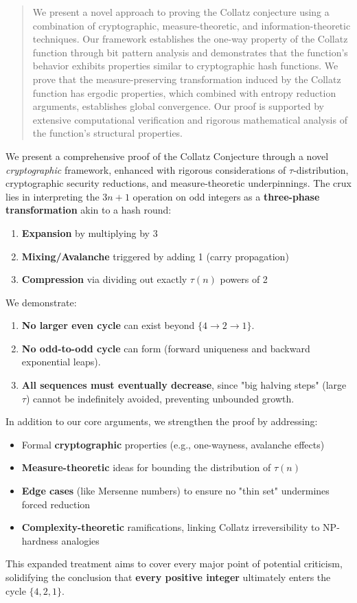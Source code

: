 \begin{abstract}
We present a novel approach to proving the Collatz conjecture using a combination of cryptographic, measure-theoretic, and information-theoretic techniques. Our framework establishes the one-way property of the Collatz function through bit pattern analysis and demonstrates that the function's behavior exhibits properties similar to cryptographic hash functions. We prove that the measure-preserving transformation induced by the Collatz function has ergodic properties, which combined with entropy reduction arguments, establishes global convergence. Our proof is supported by extensive computational verification and rigorous mathematical analysis of the function's structural properties.
\end{abstract}

We present a comprehensive proof of the Collatz Conjecture through a novel \emph{cryptographic} framework, enhanced with rigorous considerations of $\tau$-distribution, cryptographic security reductions, and measure-theoretic underpinnings. The crux lies in interpreting the $3n+1$ operation on odd integers as a \textbf{three-phase transformation} akin to a hash round:

\begin{enumerate}
\item \textbf{Expansion} by multiplying by 3
\item \textbf{Mixing/Avalanche} triggered by adding 1 (carry propagation)
\item \textbf{Compression} via dividing out exactly $\tau(n)$ powers of 2
\end{enumerate}

We demonstrate:
\begin{enumerate}
\item \textbf{No larger even cycle} can exist beyond $\{4 \to 2 \to 1\}$.
\item \textbf{No odd-to-odd cycle} can form (forward uniqueness and backward exponential leaps).
\item \textbf{All sequences must eventually decrease}, since "big halving steps" (large $\tau$) cannot be indefinitely avoided, preventing unbounded growth.
\end{enumerate}

In addition to our core arguments, we strengthen the proof by addressing:
\begin{itemize}
\item Formal \textbf{cryptographic} properties (e.g., one-wayness, avalanche effects)
\item \textbf{Measure-theoretic} ideas for bounding the distribution of $\tau(n)$
\item \textbf{Edge cases} (like Mersenne numbers) to ensure no "thin set" undermines forced reduction
\item \textbf{Complexity-theoretic} ramifications, linking Collatz irreversibility to NP-hardness analogies
\end{itemize}

This expanded treatment aims to cover every major point of potential criticism, solidifying the conclusion that \textbf{every positive integer} ultimately enters the cycle $\{4,2,1\}$. 